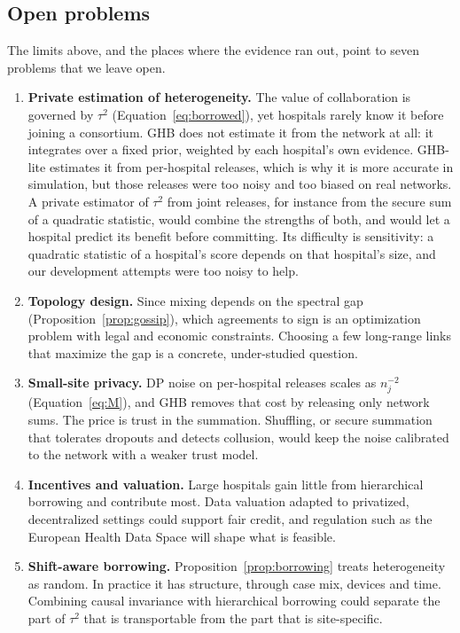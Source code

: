 \documentclass[acmsmall,screen,review]{acmart}
\theoremstyle{acmdefinition}
\begin{document}
\subsection{Open problems}\label{sec:open}

The limits above, and the places where the evidence ran out, point to seven problems that we leave open.

\begin{enumerate}[leftmargin=*,itemsep=3pt]
\item \textbf{Private estimation of heterogeneity.} The value of collaboration is governed by $\tau^2$ (Equation~\eqref{eq:borrowed}), yet hospitals rarely know it before joining a consortium. GHB does not estimate it from the network at all: it integrates over a fixed prior, weighted by each hospital's own evidence. GHB-lite estimates it from per-hospital releases, which is why it is more accurate in simulation, but those releases were too noisy and too biased on real networks. A private estimator of $\tau^2$ from joint releases, for instance from the secure sum of a quadratic statistic, would combine the strengths of both, and would let a hospital predict its benefit before committing. Its difficulty is sensitivity: a quadratic statistic of a hospital's score depends on that hospital's size, and our development attempts were too noisy to help.
\item \textbf{Topology design.} Since mixing depends on the spectral gap (Proposition~\ref{prop:gossip}), which agreements to sign is an optimization problem with legal and economic constraints. Choosing a few long-range links that maximize the gap is a concrete, under-studied question.
\item \textbf{Small-site privacy.} DP noise on per-hospital releases scales as $n_j^{-2}$ (Equation~\eqref{eq:M}), and GHB removes that cost by releasing only network sums. The price is trust in the summation. Shuffling, or secure summation that tolerates dropouts and detects collusion, would keep the noise calibrated to the network with a weaker trust model.
\item \textbf{Incentives and valuation.} Large hospitals gain little from hierarchical borrowing and contribute most. Data valuation \cite{ghorbani2019data} adapted to privatized, decentralized settings could support fair credit, and regulation such as the European Health Data Space \cite{ehds2025} will shape what is feasible.
\item \textbf{Shift-aware borrowing.} Proposition~\ref{prop:borrowing} treats heterogeneity as random. In practice it has structure, through case mix, devices and time. Combining causal invariance \cite{arjovsky2019invariant,castro2020causality} with hierarchical borrowing could separate the part of $\tau^2$ that is transportable from the part that is site-specific.

\end{enumerate}
\end{document}
